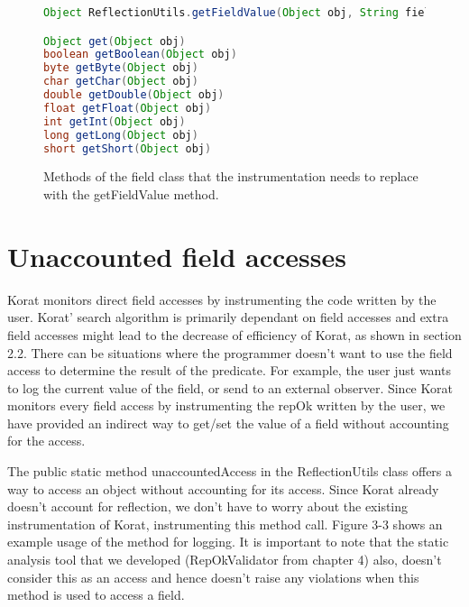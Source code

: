 \begin{figure}
\centering
\begin{lstlisting}[language=Java]
Object ReflectionUtils.getFieldValue(Object obj, String fieldName)

Object get(Object obj)
boolean getBoolean(Object obj)
byte getByte(Object obj)
char getChar(Object obj)
double getDouble(Object obj)
float getFloat(Object obj)
int getInt(Object obj)
long getLong(Object obj)
short getShort(Object obj)

\end{lstlisting}
\caption{Methods of the field class that the instrumentation needs to replace with the getFieldValue method.}
\label{fig:fieldClassInstrumentationMethods}
\end{figure}

\section{Unaccounted field accesses}
Korat monitors direct field accesses by instrumenting the code written by the user. Korat’ search algorithm is primarily dependant on field accesses and extra field accesses might lead to the decrease of efficiency of Korat, as shown in section 2.2. There can be situations where the programmer doesn’t want to use the field access to determine the result of the predicate. For example, the user just wants to log the current value of the field, or send to an external observer. Since Korat monitors every field access by instrumenting the repOk written by the user, we have provided an indirect way to get/set the value of a field without accounting for the access.

\par
The public static method unaccountedAccess in the ReflectionUtils class offers a way to access an object without accounting for its access. Since Korat already doesn’t account for reflection, we don’t have to worry about the existing instrumentation of Korat, instrumenting this method call. Figure 3-3 shows an example usage of the method for logging. It is important to note that the static analysis tool that we developed (RepOkValidator from chapter 4) also, doesn’t consider this as an access and hence doesn’t raise any violations when this method is used to access a field.


